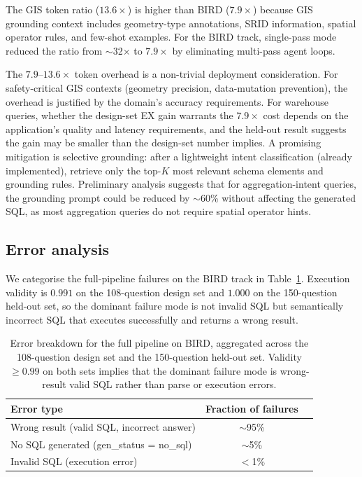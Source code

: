 \documentclass[11pt]{article}
\begin{document}
The GIS token ratio ($13.6\times$) is higher than BIRD ($7.9\times$) because GIS grounding context includes geometry-type annotations, SRID information, spatial operator rules, and few-shot examples. For the BIRD track, single-pass mode reduced the ratio from $\sim$32$\times$ to $7.9\times$ by eliminating multi-pass agent loops.

The $7.9$--$13.6\times$ token overhead is a non-trivial deployment consideration. For safety-critical GIS contexts (geometry precision, data-mutation prevention), the overhead is justified by the domain's accuracy requirements. For warehouse queries, whether the design-set EX gain warrants the $7.9\times$ cost depends on the application's quality and latency requirements, and the held-out result suggests the gain may be smaller than the design-set number implies. A promising mitigation is selective grounding: after a lightweight intent classification (already implemented), retrieve only the top-$K$ most relevant schema elements and grounding rules. Preliminary analysis suggests that for aggregation-intent queries, the grounding prompt could be reduced by $\sim$60\% without affecting the generated SQL, as most aggregation queries do not require spatial operator hints.

\subsection{Error analysis}
\label{sec:error}

We categorise the full-pipeline failures on the BIRD track in Table~\ref{tab:errors}. Execution validity is $0.991$ on the 108-question design set and $1.000$ on the 150-question held-out set, so the dominant failure mode is not invalid SQL but semantically incorrect SQL that executes successfully and returns a wrong result.

\begin{table}[t]
\centering
\caption{Error breakdown for the full pipeline on BIRD, aggregated across the 108-question design set and the 150-question held-out set. Validity $\geq 0.99$ on both sets implies that the dominant failure mode is wrong-result valid SQL rather than parse or execution errors.}
\label{tab:errors}
\begin{tabular}{lcc}
\toprule
Error type & Fraction of failures \\
\midrule
Wrong result (valid SQL, incorrect answer) & $\sim$95\% \\
No SQL generated (gen\_status = no\_sql)    & $\sim$5\% \\
Invalid SQL (execution error)              & $<$1\% \\
\bottomrule
\end{tabular}
\end{table}
\end{document}

